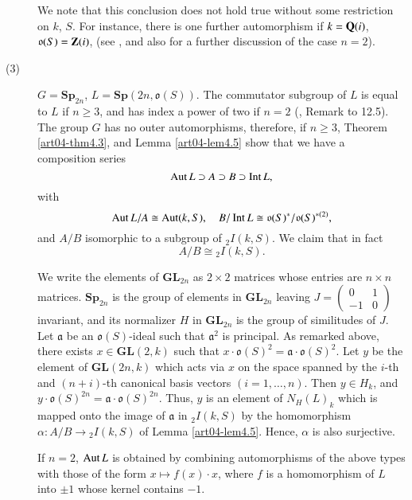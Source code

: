 \begin{description}
We note that this conclusion does not hold true without some restriction on $k$, $S$. For instance, there is one further automorphism if $k=\mathbf{Q}(i)$, $\mathfrak{o}(S)=\mathbf{Z}(i)$, (see \cite{art04-key20}, and also \cite{art04-key21} for a further discussion of the case $n=2$).

\item[\rm(3)] $G=\mathbf{Sp}_{2n}$, $L=\mathbf{Sp}(2n,\mathfrak{o}(S))$. The commutator subgroup of $L$ is equal to $L$ if $n\geq 3$, and has index a power of two if $n=2$ (\cite{art04-key3}, Remark to 12.5). The group $G$ has no outer automorphisms, therefore, if $n\geq 3$, Theorem \ref{art04-thm4.3}, and Lemma \ref{art04-lem4.5} show that we have a composition series
$$
\operatorname{\mathrm{Aut}} L\supset A\supset B\supset \operatorname{\mathrm{Int}} L,
$$
with
$$
\operatorname{\mathrm{Aut}} L/A\cong \operatorname{\mathrm{Aut}} (k,S),\quad B/\operatorname{\mathrm{Int}} L\cong\mathfrak{o}(S)^{*}/\mathfrak{o}(S)^{*(2)},
$$
and $A/B$ isomorphic to a subgroup of ${}_{2}I(k,S)$. We claim that in fact
$$
A/B\cong {}_{2}I(k,S).
$$

We write the elements of $\mathbf{GL}_{2n}$ as $2\times 2$ matrices whose entries are $n\times n$ matrices. $\mathbf{Sp}_{2n}$ is the group of elements in $\mathbf{GL}_{2n}$ leaving $J=\left(\begin{smallmatrix} 0 & 1\\ -1 & 0\end{smallmatrix}\right)$ invariant, and its normalizer $H$ in $\mathbf{GL}_{2n}$ is the group of similitudes of $J$. Let $\mathfrak{a}$ be an $\mathfrak{o}(S)$-ideal such that $\mathfrak{a}^{2}$ is principal. As remarked above, there exists $x\in \mathbf{GL}(2,k)$ such that $x\cdot \mathfrak{o}(S)^{2}=\mathfrak{a}\cdot \mathfrak{o}(S)^{2}$. Let $y$ be the element of $\mathbf{GL}(2n,k)$ which acts via $x$ on the space spanned by the $i$-th and $(n+i)$-th canonical basis vectors $(i=1,\ldots,n)$. Then $y\in H_{k}$, and $y\cdot \mathfrak{o}(S)^{2n}=\mathfrak{a}\cdot \mathfrak{o}(S)^{2n}$. Thus, $y$ is an element of $N_{H}(L)_{k}$ which is mapped onto the image of $\mathfrak{a}$ in ${}_{2}I(k,S)$ by the homomorphism $\alpha:A/B\to {}_{2}I(k,S)$ of Lemma \ref{art04-lem4.5}. Hence, $\alpha$ is also surjective.

If $n=2$, $\operatorname{\mathrm{Aut}} L$ is obtained by combining automorphisms of the above types with those of the form $x\mapsto f(x)\cdot x$, where $f$ is a homomorphism of $L$ into $\pm 1$ whose kernel contains $-1$.
\end{description}

